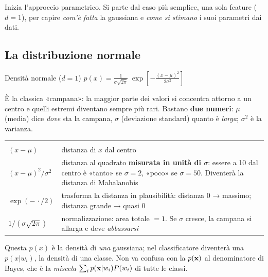 
Inizia l'approccio parametrico. Si parte dal caso più semplice, una sola feature ($d=1$), per capire \emph{com'è fatta} la gaussiana e \emph{come si stimano} i suoi parametri dai dati.

\subsection{La distribuzione normale}
\begin{formulat}{Densità normale ($d=1$)}
$\displaystyle p(x)=\frac{1}{\sigma\sqrt{2\pi}}\;\exp\!\left[-\frac{(x-\mu)^2}{2\sigma^2}\right]$
\end{formulat}
\begin{intuizione}
È la classica «campana»: la maggior parte dei valori si concentra attorno a un centro e quelli estremi diventano sempre più rari. Bastano \textbf{due numeri}: $\mu$ (media) dice \emph{dove} sta la campana, $\sigma$ (deviazione standard) quanto è \emph{larga}; $\sigma^2$ è la varianza.
\end{intuizione}

\begin{center}
\begin{tabularx}{\linewidth}{>{\centering\arraybackslash}m{3cm} Y}
 & \\
$(x-\mu)$ & distanza di $x$ dal centro\\
$(x-\mu)^2/\sigma^2$ & distanza al quadrato \textbf{misurata in unità di $\sigma$}: essere a 10 dal centro è «tanto» se $\sigma=2$, «poco» se $\sigma=50$. Diventerà la distanza di Mahalanobis\\
$\exp(-\,\cdot/2)$ & trasforma la distanza in plausibilità: distanza 0 → massimo; distanza grande → quasi 0\\
$1/(\sigma\sqrt{2\pi})$ & normalizzazione: area totale $=1$. Se $\sigma$ cresce, la campana si allarga e deve \emph{abbassarsi}\\
\end{tabularx}
\end{center}


\begin{attenzione}
Questa $p(x)$ è la densità di \emph{una} gaussiana; nel classificatore diventerà una $p(x|w_i)$, la densità di una classe. Non va confusa con la $p(\mathbf{x})$ al denominatore di Bayes, che è la \emph{miscela} $\sum_i p(\mathbf{x}|w_i)P(w_i)$ di tutte le classi.
\end{attenzione}

